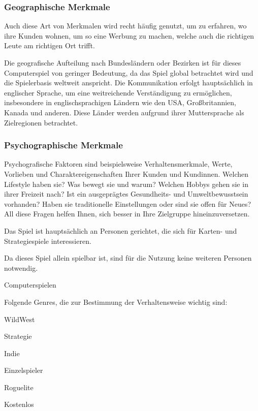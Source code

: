 \subsubsection{Geographische Merkmale}\label{subsubsec:Geographische-Merkmale}

\begin{coolQuote}
    Auch diese Art von Merkmalen wird recht häufig genutzt, um zu erfahren, wo ihre Kunden wohnen, um so eine Werbung zu machen, welche auch die richtigen Leute am richtigen Ort trifft.
\end{coolQuote}

Die geografische Aufteilung nach Bundesländern oder Bezirken ist für dieses Computerspiel von geringer Bedeutung, da das Spiel global betrachtet wird und die Spielerbasis weltweit anspricht.
Die Kommunikation erfolgt hauptsächlich in englischer Sprache, um eine weitreichende Verständigung zu ermöglichen, insbesondere in englischsprachigen Ländern wie den USA, Großbritannien, Kanada und anderen.
Diese Länder werden aufgrund ihrer Muttersprache als Zielregionen betrachtet.

\subsubsection{Psychographische Merkmale}\label{subsubsec:Psychographische-Merkmale}

\begin{coolQuote}
Psychografische Faktoren sind beispielsweise Verhaltensmerkmale, Werte, Vorlieben und Charaktereigenschaften Ihrer Kunden und Kundinnen.
Welchen Lifestyle haben sie?
Was bewegt sie und warum?
Welchen Hobbys gehen sie in ihrer Freizeit nach?
Ist ein ausgeprägtes Gesundheits- und Umweltbewusstsein vorhanden?
Haben sie traditionelle Einstellungen oder
sind sie offen für Neues?
All diese Fragen helfen Ihnen, sich besser in Ihre Zielgruppe hineinzuversetzen.
\end{coolQuote}

 Das Spiel ist hauptsächlich an Personen gerichtet, die sich für Karten- und Strategiespiele interessieren.

 Da dieses Spiel allein spielbar ist, sind für die Nutzung keine weiteren Personen notwendig.

 Computerspielen

Folgende Genres, die zur Bestimmung der Verhaltensweise wichtig sind:
\begin{liste}
    \item WildWest
    \item Strategie
    \item Indie
    \item Einzelspieler
    \item Roguelite
    \item Kostenlos
\end{liste}


